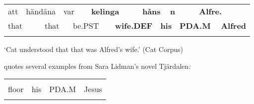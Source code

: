 \begin{tabular}{llllllllllllll}
\lsptoprule
att & \multicolumn{2}{l}{händäna

} & \multicolumn{2}{l}{var

} & \multicolumn{2}{l}{{\bfseries kelinga}

} & \multicolumn{2}{l}{{\bfseries håns}

} & \multicolumn{2}{l}{{\bfseries n}

} & \multicolumn{2}{l}{{\bfseries Alfre.}

} & \\
\multicolumn{2}{l}{that

} & \multicolumn{2}{l}{that

} & \multicolumn{2}{l}{be.PST

} & \multicolumn{2}{l}{{\bfseries wife.DEF}

} & \multicolumn{2}{l}{{\bfseries his}

} & \multicolumn{2}{l}{{\bfseries PDA.M}

} & \multicolumn{2}{l}{{\bfseries Alfred}

}\\
\lspbottomrule
\end{tabular}

\begin{styleTranslation}
 ‘Cat understood that that was Alfred’s wife.’ (Cat Corpus)

\end{styleTranslation}

\citet[51]{Dahlstedt1971} quotes several examples from Sara Lidman’s novel Tjärdalen\textit{:}

\begin{listWWNumileveli}
\item 

\end{listWWNumileveli}

\begin{listWWNumlxxxleveli}
\item 

\end{listWWNumlxxxleveli}

\begin{tabular}{llll}
\lsptoprule
\multicolumn{4}{l}{golvet

}\\
floor & his & PDA.M & Jesus\\
\lspbottomrule
\end{tabular}

